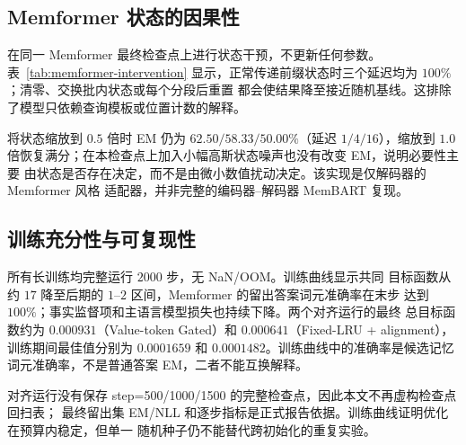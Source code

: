 \documentclass[letterpaper]{article}
\begin{document}
\subsection{Memformer 状态的因果性}

在同一 Memformer 最终检查点上进行状态干预，不更新任何参数。表~\ref{tab:memformer-intervention}
显示，正常传递前缀状态时三个延迟均为 $100\%$；清零、交换批内状态或每个分段后重置
都会使结果降至接近随机基线。这排除了模型只依赖查询模板或位置计数的解释。

\begin{table}[t]
\centering
\scriptsize
\caption{Memformer 循环状态因果干预（EM 为 \%，答案 NLL 为三个延迟的总体值）。}
\label{tab:memformer-intervention}
%
\end{table}

将状态缩放到 $0.5$ 倍时 EM 仍为 $62.50/58.33/50.00\%$（延迟 $1/4/16$），缩放到
$1.0$ 倍恢复满分；在本检查点上加入小幅高斯状态噪声也没有改变 EM，说明必要性主要
由状态是否存在决定，而不是由微小数值扰动决定。该实现是仅解码器的 Memformer 风格
适配器，并非完整的编码器--解码器 MemBART 复现。

\subsection{训练充分性与可复现性}

所有长训练均完整运行 $2000$ 步，无 NaN/OOM。训练曲线显示共同
目标函数从约 $17$ 降至后期的 $1$--$2$ 区间，Memformer 的留出答案词元准确率在末步
达到 $100\%$；事实监督项和主语言模型损失也持续下降。两个对齐运行的最终
总目标函数约为 $0.000931$（Value-token Gated）和 $0.000641$（Fixed-LRU + alignment），
训练期间最佳值分别为 $0.0001659$ 和 $0.0001482$。训练曲线中的准确率是候选记忆
词元准确率，不是普通答案 EM，二者不能互换解释。

对齐运行没有保存 step=500/1000/1500 的完整检查点，因此本文不再虚构检查点回扫表；
最终留出集 EM/NLL 和逐步指标是正式报告依据。训练曲线证明优化在预算内稳定，但单一
随机种子仍不能替代跨初始化的重复实验。
\end{document}
